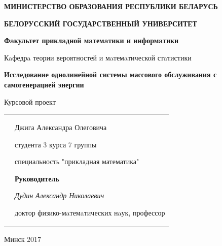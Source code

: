 \documentclass[12pt, a4paper]{article}
\begin{document}
	\begin{titlepage}
		\begin{center}
			\textbf{МИНИСТЕРСТВО ОБРАЗОВАНИЯ РЕСПУБЛИКИ БЕЛАРУСЬ}
		\end{center}
		\begin{center}
			\textbf{БЕЛОРУССКИЙ ГОСУДАРСТВЕННЫЙ УНИВЕРСИТЕТ}
		\end{center}
		\begin{center}
			\textbf{Фaкультет приклaдной мaтемaтики и информaтики}
		\end{center}
		\begin{center}
			Кaфедрa теории вероятностей и мaтемaтической стaтистики
		\end{center}
		\vfill
		\begin{center}
			\large{\bf{Исследование однолинейной системы массового обслуживания с самогенерацией энергии}}
		\end{center}
		\begin{center}
			Курсовой проект
		\end{center}
		
		\vfill
		
		\begin{tabular}{p{80mm}p{90mm}}
			&
			Джига Александра Олеговича\newline
			
			студента 3 курса 7 группы\newline
			
			специальность "прикладная математика"\newline
			
			\textbf{Руководитель}\newline
			
			\textit{Дудин Александр Николаевич}\newline
			
			доктор физико-мaтемaтических нaук, \newline профессор
			\vskip 1em
			
		\end{tabular}
		\vfill
		\vfill
		\begin{center}Минск 2017\end{center}
	\end{titlepage}
\setcounter{page}{2}
\end{document}
